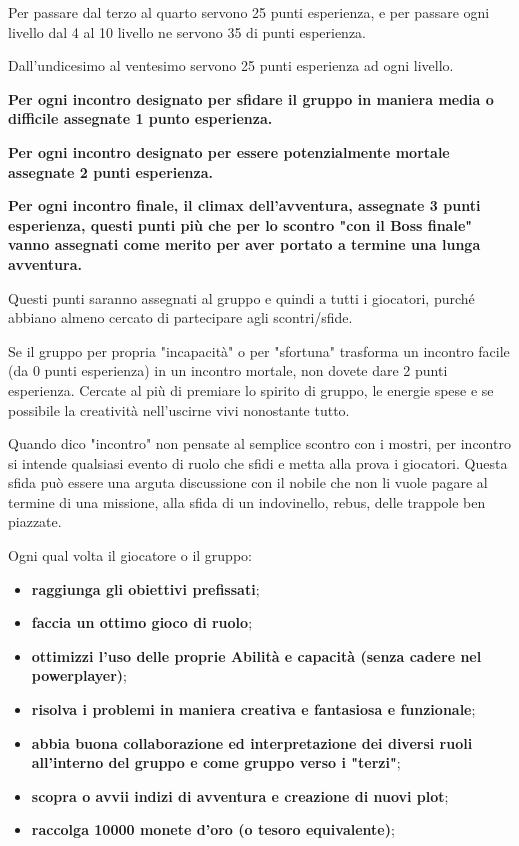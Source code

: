 \documentclass[a4paper,11pt,twoside,openany]{book}
\begin{document}
Per passare dal terzo al quarto servono 25 punti esperienza, e per passare ogni livello dal 4 al 10 livello ne servono 35 di punti esperienza.

Dall'undicesimo al ventesimo servono 25 punti esperienza ad ogni livello.

\textbf{Per ogni incontro designato per sfidare il gruppo in maniera media o difficile assegnate 1 punto esperienza.}

\textbf{Per ogni incontro designato per essere potenzialmente mortale assegnate 2 punti esperienza.}

\textbf{Per ogni incontro finale, il climax dell'avventura, assegnate 3 punti esperienza, questi punti più che per lo scontro "con il Boss finale" vanno assegnati come merito per aver portato a termine una lunga avventura.}

Questi punti saranno assegnati al gruppo e quindi a tutti i giocatori, purché abbiano almeno cercato di partecipare agli scontri/sfide.

Se il gruppo per propria "incapacità" o per "sfortuna" trasforma un incontro facile (da 0 punti esperienza) in un incontro mortale, non dovete dare 2 punti esperienza. Cercate al più di premiare lo spirito di gruppo, le energie spese e se possibile la creatività nell'uscirne vivi  nonostante tutto.

Quando dico "incontro" non pensate al semplice scontro con i mostri, per incontro si intende qualsiasi evento di ruolo che sfidi e metta alla prova i giocatori. Questa sfida può essere una arguta discussione con il nobile che non li vuole pagare al termine di una missione, alla sfida di un indovinello, rebus, delle trappole ben piazzate.

\bigskip

Ogni qual volta il giocatore o il gruppo:
\begin{itemize}
	\item
	      \textbf{raggiunga gli obiettivi prefissati};
	\item
	      \textbf{faccia un ottimo gioco di ruolo};
	\item
	      \textbf{ottimizzi l'uso delle proprie Abilità e capacità (senza cadere nel powerplayer)};
	\item
	      \textbf{risolva i problemi in maniera creativa e fantasiosa e funzionale};
	\item
	      \textbf{abbia buona collaborazione ed interpretazione dei diversi ruoli all'interno del gruppo e come gruppo verso i "terzi"};
	\item
	      \textbf{scopra o avvii indizi di avventura e creazione di nuovi plot};
	\item
	      \textbf{raccolga 10000 monete d'oro (o tesoro equivalente)};
\end{itemize}
\end{document}
